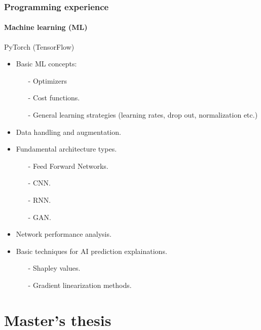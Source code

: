 \documentclass[
	10pt, %
]{beamer}
\begin{document}
\begin{frame}
	\frametitle{Programming experience}
	\framesubtitle{Machine learning (ML)}

	{\large PyTorch} (TensorFlow) 
	\begin{itemize}
		\item Basic ML concepts: 
		\begin{itemize}
			\item [-] Optimizers
			\item [-] Cost functions.
			\item [-] General learning strategies (learning rates, drop out, normalization etc.)
		\end{itemize}
		
		\item Data handling and augmentation.
		\item Fundamental architecture types. 
		\begin{itemize}
			\item [-] Feed Forward Networks.
			\item [-] CNN.
			\item [-] RNN.
			\item [-] GAN.
		\end{itemize}
		\item Network performance analysis.
		\item Basic techniques for AI prediction explainations.
		\begin{itemize}
			\item [-] Shapley values.
			\item [-] Gradient linearization methods.
		\end{itemize}
	
	\end{itemize}


\end{frame}





\section{Master's thesis}
\end{document}
